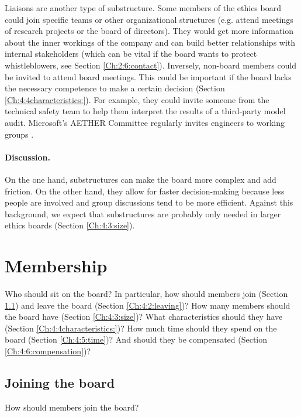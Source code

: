 \documentclass{article}
\begin{document}
Liaisons are another type of substructure. Some members of the ethics board could join specific teams or other organizational structures (e.g. attend meetings of research projects or the board of directors). They would get more information about the inner workings of the company and can build better relationships with internal stakeholders (which can be vital if the board wants to protect whistleblowers, see Section \ref{Ch:2:6:contact}). Inversely, non-board members could be invited to attend board meetings. This could be important if the board lacks the necessary competence to make a certain decision (Section \ref{Ch:4:4characteristics:}). For example, they could invite someone from the technical safety team to help them interpret the results of a third-party model audit. Microsoft’s AETHER Committee regularly invites engineers to working groups \cite{microsoft2020principles}.

\paragraph{Discussion.} On the one hand, substructures can make the board more complex and add friction. On the other hand, they allow for faster decision-making because less people are involved and group discussions tend to be more efficient. Against this background, we expect that substructures are probably only needed in larger ethics boards (Section \ref{Ch:4:3:size}).

\section{Membership}\label{Ch:4:membership}

Who should sit on the board? In particular, how should members join (Section \ref{Ch:4:1:joining}) and leave the board (Section \ref{Ch:4:2:leaving})? How many members should the board have (Section \ref{Ch:4:3:size})? What characteristics should they have (Section \ref{Ch:4:4characteristics:})? How much time should they spend on the board (Section \ref{Ch:4:5:time})? And should they be compensated (Section \ref{Ch:4:6:compensation})?

\subsection{Joining the board}\label{Ch:4:1:joining}

How should members join the board?
\end{document}
